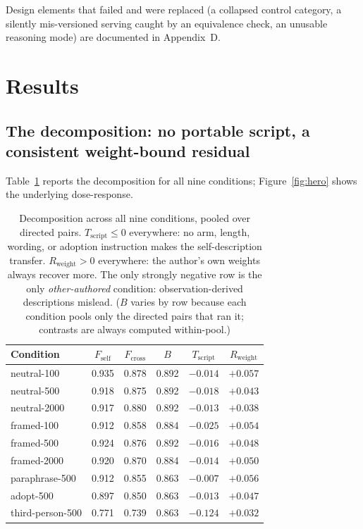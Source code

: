 \documentclass[11pt]{article}
\newcommand{\Fself}{F_{\mathrm{self}}}
\newcommand{\Fcross}{F_{\mathrm{cross}}}
\newcommand{\B}{B}
\newcommand{\Tscript}{T_{\mathrm{script}}}
\newcommand{\Rweight}{R_{\mathrm{weight}}}
\begin{document}
Design elements that failed and were replaced (a collapsed control category, a
silently mis-versioned serving caught by an equivalence check, an unusable
reasoning mode) are documented in Appendix~D.

\section{Results}
\subsection{The decomposition: no portable script, a consistent weight-bound residual}
Table~\ref{tab:decomp} reports the decomposition for all nine conditions;
Figure~\ref{fig:hero} shows the underlying dose-response.
\begin{table}[h]
\centering\small
\begin{tabular}{lccccc}
\toprule
Condition & $\Fself$ & $\Fcross$ & $\B$ & $\Tscript$ & $\Rweight$ \\
\midrule
neutral-100  & 0.935 & 0.878 & 0.892 & $-0.014$ & $+0.057$ \\
neutral-500  & 0.918 & 0.875 & 0.892 & $-0.018$ & $+0.043$ \\
neutral-2000 & 0.917 & 0.880 & 0.892 & $-0.013$ & $+0.038$ \\
framed-100   & 0.912 & 0.858 & 0.884 & $-0.025$ & $+0.054$ \\
framed-500   & 0.924 & 0.876 & 0.892 & $-0.016$ & $+0.048$ \\
framed-2000  & 0.920 & 0.870 & 0.884 & $-0.014$ & $+0.050$ \\
paraphrase-500 & 0.912 & 0.855 & 0.863 & $-0.007$ & $+0.056$ \\
adopt-500    & 0.897 & 0.850 & 0.863 & $-0.013$ & $+0.047$ \\
third-person-500 & 0.771 & 0.739 & 0.863 & $-0.124$ & $+0.032$ \\
\bottomrule
\end{tabular}
\caption{Decomposition across all nine conditions, pooled over directed pairs.
$\Tscript \le 0$ everywhere: no arm, length, wording, or adoption instruction
makes the self-description transfer. $\Rweight > 0$ everywhere: the author's
own weights always recover more. The only strongly negative row is the only
\emph{other-authored} condition: observation-derived descriptions mislead.
($\B$ varies by row because each condition pools only the directed pairs that
ran it; contrasts are always computed within-pool.)}
\label{tab:decomp}
\end{table}
\end{document}
